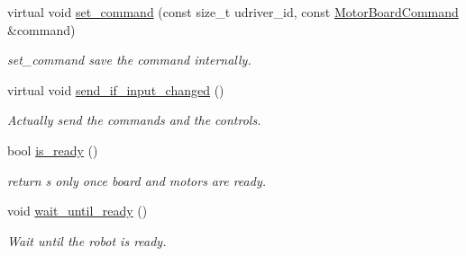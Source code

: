 \begin{DoxyCompactItemize}
virtual void \hyperlink{classblmc__drivers_1_1SpiBus_af5ca19baccb36befbbc697cdd2e2922c}{set\+\_\+command} (const size\+\_\+t udriver\+\_\+id, const \hyperlink{classblmc__drivers_1_1MotorBoardCommand}{Motor\+Board\+Command} \&command)
\begin{DoxyCompactList}\small\item\em set\+\_\+command save the command internally. \end{DoxyCompactList}\item 
virtual void \hyperlink{classblmc__drivers_1_1SpiBus_ab3802bb10a387b14c7cedc9175823421}{send\+\_\+if\+\_\+input\+\_\+changed} ()
\begin{DoxyCompactList}\small\item\em Actually send the commands and the controls. \end{DoxyCompactList}\item 
\mbox{\label{classblmc__drivers_1_1SpiBus_ac8c8047626990074b5203ea8010f4570}} 
bool \hyperlink{classblmc__drivers_1_1SpiBus_ac8c8047626990074b5203ea8010f4570}{is\+\_\+ready} ()
\begin{DoxyCompactList}\small\item\em return s only once board and motors are ready. \end{DoxyCompactList}\item 
\mbox{\label{classblmc__drivers_1_1SpiBus_a1ff5ba883178951fdd4cc2c5d41d2342}} 
void \hyperlink{classblmc__drivers_1_1SpiBus_a1ff5ba883178951fdd4cc2c5d41d2342}{wait\+\_\+until\+\_\+ready} ()
\begin{DoxyCompactList}\small\item\em Wait until the robot is ready. \end{DoxyCompactList}\end{DoxyCompactItemize}
